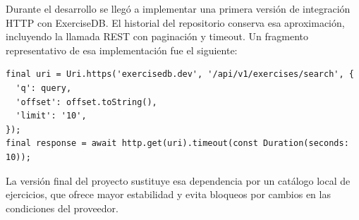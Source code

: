 Durante el desarrollo se llegó a implementar una primera versión de integración HTTP con ExerciseDB. El historial del repositorio conserva esa aproximación, incluyendo la llamada REST con paginación y timeout. Un fragmento representativo de esa implementación fue el siguiente:

\begin{lstlisting}[caption={Fragmento histórico de la integración con ExerciseDB}]
final uri = Uri.https('exercisedb.dev', '/api/v1/exercises/search', {
  'q': query,
  'offset': offset.toString(),
  'limit': '10',
});
final response = await http.get(uri).timeout(const Duration(seconds: 10));
\end{lstlisting}

La versión final del proyecto sustituye esa dependencia por un catálogo local de ejercicios, que ofrece mayor estabilidad y evita bloqueos por cambios en las condiciones del proveedor.
